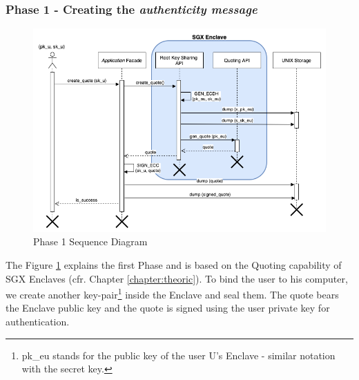 \documentclass[../main.tex]{subfiles}
\begin{document}
\subsubsection{Phase 1 - Creating the \textit{authenticity message}}
\begin{figure}[h]
    \centering
    \includegraphics[width=\textwidth]{../../images/lauxus/create_quote}
    
    \caption{Phase 1 Sequence Diagram}
    \label{figure:lauxus:create_quote}
\end{figure}
\par The Figure \ref{figure:lauxus:create_quote} explains the first Phase and is based on the Quoting capability of SGX Enclaves (cfr. Chapter \ref{chapter:theoric}). To bind the user to his computer, we create another key-pair\footnote{pk\_eu stands for the public key of the user U's Enclave - similar notation with the secret key.} inside the Enclave and seal them. The quote bears the Enclave public key and the quote is signed using the user private key for authentication.
\end{document}
